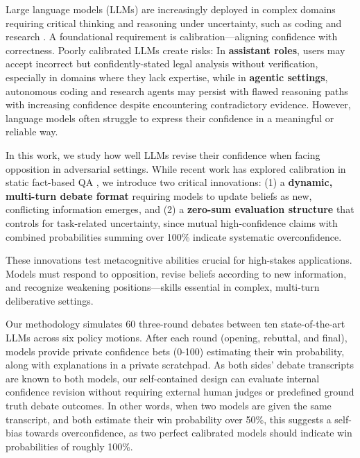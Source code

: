 \documentclass{article}
\begin{document}
Large language models (LLMs) are increasingly deployed in complex domains requiring critical thinking and reasoning under uncertainty, such as coding and research \citep{handa2025economictasksperformedai, zheng2025deepresearcherscalingdeepresearch}. A foundational requirement is calibration—aligning confidence with correctness. Poorly calibrated LLMs create risks: In \textbf{assistant roles}, users may accept incorrect but confidently-stated legal analysis without verification, especially in domains where they lack expertise, while in \textbf{agentic settings}, autonomous coding and research agents may persist with flawed reasoning paths with increasing confidence despite encountering contradictory evidence. However, language models often struggle to express their confidence in a meaningful or reliable way.

In this work, we study how well LLMs revise their confidence when facing opposition in adversarial settings. While recent work has explored calibration in static fact-based QA \citep{tian2023justask, xiong2024uncertainty, kadavath2022know,groot-valdenegro-toro-2024-overconfidence}, we introduce two critical innovations:
(1) a \textbf{dynamic, multi-turn debate format} requiring models to update beliefs as new, conflicting information emerges, and
(2) a \textbf{zero-sum evaluation structure} that controls for task-related uncertainty, since mutual high-confidence claims with combined probabilities summing over 100\% indicate systematic overconfidence.

These innovations test metacognitive abilities crucial for high-stakes applications. Models must respond to opposition, revise beliefs according to new information, and recognize weakening positions—skills essential in complex, multi-turn deliberative settings.

Our methodology simulates 60 three-round debates between ten state-of-the-art LLMs across six policy motions. After each round (opening, rebuttal, and final), models provide private confidence bets (0-100) estimating their win probability, along with explanations in a private scratchpad. As both sides' debate transcripts are known to both models, our self-contained design can evaluate internal confidence revision without requiring external human judges or predefined ground truth debate outcomes. In other words, when two models are given the same transcript, and both estimate their win probability over 50\%, this suggests a self-bias towards overconfidence, as two perfect calibrated models should indicate win probabilities of roughly 100\%.
\end{document}
